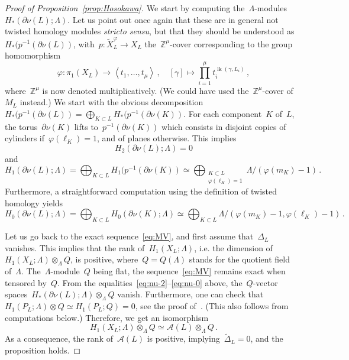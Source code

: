 \documentclass{amsart}
\newcommand{\Z}{\mathbb{Z}}
\newcommand{\A}{\mathcal{A}}
\DeclareMathOperator{\lk}{lk}
\theoremstyle{definition}
\theoremstyle{remark}
\begin{document}
\begin{proof}[Proof of Proposition~\ref{prop:Hosokawa}]
	We start by computing the~$\Lambda$-modules~$H_*(\partial\nu(L);\Lambda)$.
	Let us point out once again that these are in general not twisted homology modules {\em stricto sensu\/}, but that
	they should be understood as~$H_*(p^{-1}(\partial\nu(L))$, with~$p\colon \widetilde{X}^{\varphi}_L\to X_L$
	the~$\Z^\mu$-cover corresponding to the group homomorphism
	\[
	\varphi\colon\pi_1(X_L)\longrightarrow\left<t_1,\dots,t_\mu\right>\,,\quad[\gamma]\longmapsto\prod_{i=1}^\mu t_i^{\lk(\gamma,L_i)}\,,
	\]
	where~$\Z^\mu$ is now denoted multiplicatively. (We could have used the~$\Z^\mu$-cover of~$M_L$ instead.)
	We start with the obvious decomposition~$H_*(p^{-1}(\partial\nu(L))=\bigoplus_{K\subset L}H_*(p^{-1}(\partial\nu(K))$. For each component~$K$ of~$L$, the torus~$\partial\nu(K)$ lifts to~$p^{-1}(\partial\nu(K))$ which consists in disjoint copies
	of cylinders if~$\varphi(\ell_K)=1$, and of planes otherwise. This implies
	\begin{equation}
	\label{eq:nu-2}
	H_2(\partial\nu(L);\Lambda)=0
	\end{equation}
and
	\begin{equation}
	\label{eq:nu-1}
	H_1(\partial\nu(L);\Lambda)=\bigoplus_{K\subset L}H_1(p^{-1}(\partial\nu(K))\simeq\bigoplus_{\substack{K\subset L\\\varphi(\ell_K)=1}}\Lambda/(\varphi(m_K)-1)\,.%
	\end{equation}
	Furthermore, a straightforward computation using the definition of twisted homology yields
		\begin{equation}
		\label{eq:nu-0}
	H_0(\partial\nu(L);\Lambda)=\bigoplus_{K\subset L}H_0(\partial\nu(K);\Lambda)\simeq\bigoplus_{K\subset L}\Lambda/(\varphi(m_K)-1,\varphi(\ell_K)-1)\,.
	\end{equation}
	
	Let us go back to the exact sequence~\eqref{eq:MV}, and first assume that~$\Delta_L$ vanishes. This implies that the rank of~$H_1(X_L;\Lambda)$, i.e. the dimension
	of~$H_1(X_L;\Lambda)\otimes_\Lambda Q$, is positive, where~$Q=Q(\Lambda)$ stands for the quotient field of~$\Lambda$. The~$\Lambda$-module~$Q$ being flat, the sequence~\eqref{eq:MV} remains exact when tensored by~$Q$.
	From the equalities~\eqref{eq:nu-2}--\eqref{eq:nu-0} above, the~$Q$-vector spaces~$H_*(\partial\nu(L);\Lambda)\otimes_\Lambda Q$ vanish. Furthermore, one can check that~$H_1(P_L;\Lambda)\otimes Q\simeq H_1(P_L;Q)=0$,
	see the proof of~\cite[Lemma~3.3]{BFP16}. (This also follows from computations below.) Therefore, we
	get an isomorphism
	\begin{equation*}
	H_1(X_L;\Lambda)\otimes_\Lambda Q\simeq\A(L)\otimes_\Lambda Q\,.
	\end{equation*}
	As a consequence, the rank of~$\A(L)$ is positive, implying~$\widetilde\Delta_L=0$, and the proposition holds.
	

\end{proof}
\end{document}
